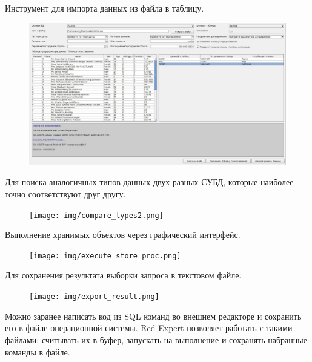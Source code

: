 
Инструмент для импорта данных из файла в таблицу.

\begin{figure}[H]
	\centering
	\includegraphics[width = 0.95\linewidth]{img/ImportData.png}
\end{figure}


Для поиска аналогичных типов данных двух разных СУБД, которые наиболее точно соответствуют друг другу.
	\begin{figure}[H]
		\centering
		\texttt{[image: img/compare\_types2.png]}
	\end{figure}


Выполнение хранимых объектов через графический интерфейс.
	\begin{figure}[H]
		\centering
		\texttt{[image: img/execute\_store\_proc.png]}
	\end{figure}
	

Для сохранения результата выборки  запроса в текстовом файле.
	\begin{figure}[H]
		\centering
		\texttt{[image: img/export\_result.png]}
	\end{figure}

Можно заранее написать код из SQL команд во внешнем редакторе и сохранить его в файле операционной системы. Red Expert позволяет работать с такими файлами: считывать их в буфер, запускать на выполнение и сохранять набранные команды в файле.


